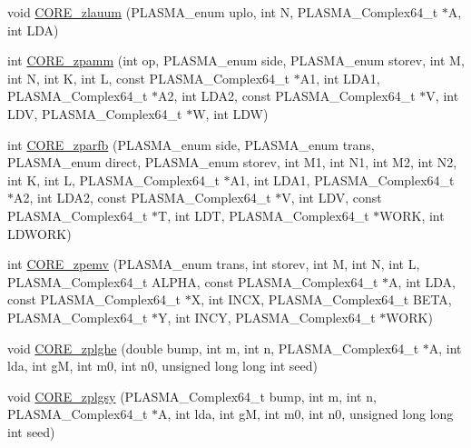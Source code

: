 \begin{DoxyCompactItemize}
\item 
void \hyperlink{group__CORE__PLASMA__Complex64__t_ga385445ea00b8743a30255e844d48e659_ga385445ea00b8743a30255e844d48e659}{C\+O\+R\+E\+\_\+zlauum} (P\+L\+A\+S\+M\+A\+\_\+enum uplo, int N, P\+L\+A\+S\+M\+A\+\_\+\+Complex64\+\_\+t $\ast$A, int L\+D\+A)
\item 
int \hyperlink{group__CORE__PLASMA__Complex64__t_ga6cd8ef0c6bfe32c447688252474c5317_ga6cd8ef0c6bfe32c447688252474c5317}{C\+O\+R\+E\+\_\+zpamm} (int op, P\+L\+A\+S\+M\+A\+\_\+enum side, P\+L\+A\+S\+M\+A\+\_\+enum storev, int M, int N, int K, int L, const P\+L\+A\+S\+M\+A\+\_\+\+Complex64\+\_\+t $\ast$A1, int L\+D\+A1, P\+L\+A\+S\+M\+A\+\_\+\+Complex64\+\_\+t $\ast$A2, int L\+D\+A2, const P\+L\+A\+S\+M\+A\+\_\+\+Complex64\+\_\+t $\ast$V, int L\+D\+V, P\+L\+A\+S\+M\+A\+\_\+\+Complex64\+\_\+t $\ast$W, int L\+D\+W)
\item 
int \hyperlink{group__CORE__PLASMA__Complex64__t_ga1befcc510fe4a56479f4510d6391f5d1_ga1befcc510fe4a56479f4510d6391f5d1}{C\+O\+R\+E\+\_\+zparfb} (P\+L\+A\+S\+M\+A\+\_\+enum side, P\+L\+A\+S\+M\+A\+\_\+enum trans, P\+L\+A\+S\+M\+A\+\_\+enum direct, P\+L\+A\+S\+M\+A\+\_\+enum storev, int M1, int N1, int M2, int N2, int K, int L, P\+L\+A\+S\+M\+A\+\_\+\+Complex64\+\_\+t $\ast$A1, int L\+D\+A1, P\+L\+A\+S\+M\+A\+\_\+\+Complex64\+\_\+t $\ast$A2, int L\+D\+A2, const P\+L\+A\+S\+M\+A\+\_\+\+Complex64\+\_\+t $\ast$V, int L\+D\+V, const P\+L\+A\+S\+M\+A\+\_\+\+Complex64\+\_\+t $\ast$T, int L\+D\+T, P\+L\+A\+S\+M\+A\+\_\+\+Complex64\+\_\+t $\ast$W\+O\+R\+K, int L\+D\+W\+O\+R\+K)
\item 
int \hyperlink{group__CORE__PLASMA__Complex64__t_ga94677fa952f3b3c30c2bc808c5633dcc_ga94677fa952f3b3c30c2bc808c5633dcc}{C\+O\+R\+E\+\_\+zpemv} (P\+L\+A\+S\+M\+A\+\_\+enum trans, int storev, int M, int N, int L, P\+L\+A\+S\+M\+A\+\_\+\+Complex64\+\_\+t A\+L\+P\+H\+A, const P\+L\+A\+S\+M\+A\+\_\+\+Complex64\+\_\+t $\ast$A, int L\+D\+A, const P\+L\+A\+S\+M\+A\+\_\+\+Complex64\+\_\+t $\ast$X, int I\+N\+C\+X, P\+L\+A\+S\+M\+A\+\_\+\+Complex64\+\_\+t B\+E\+T\+A, P\+L\+A\+S\+M\+A\+\_\+\+Complex64\+\_\+t $\ast$Y, int I\+N\+C\+Y, P\+L\+A\+S\+M\+A\+\_\+\+Complex64\+\_\+t $\ast$W\+O\+R\+K)
\item 
void \hyperlink{group__CORE__PLASMA__Complex64__t_ga5fac8b3a95f1614cab7b96d9a9255266_ga5fac8b3a95f1614cab7b96d9a9255266}{C\+O\+R\+E\+\_\+zplghe} (double bump, int m, int n, P\+L\+A\+S\+M\+A\+\_\+\+Complex64\+\_\+t $\ast$A, int lda, int g\+M, int m0, int n0, unsigned long long int seed)
\item 
void \hyperlink{group__CORE__PLASMA__Complex64__t_ga0ef92bf401ad13b407a15543d952d5ef_ga0ef92bf401ad13b407a15543d952d5ef}{C\+O\+R\+E\+\_\+zplgsy} (P\+L\+A\+S\+M\+A\+\_\+\+Complex64\+\_\+t bump, int m, int n, P\+L\+A\+S\+M\+A\+\_\+\+Complex64\+\_\+t $\ast$A, int lda, int g\+M, int m0, int n0, unsigned long long int seed)

\end{DoxyCompactItemize}

